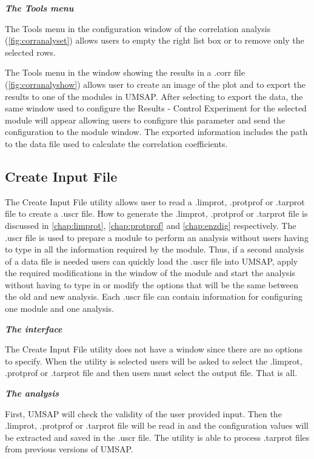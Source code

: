 \textit{\textbf{The Tools menu}}

The Tools menu in the configuration window of the correlation analysis (\autoref{fig:corranalyset}) allows users to empty the right list box or to remove only the selected rows.

The Tools menu in the window showing the results in a .corr file (\autoref{fig:corranalyshow}) allows user to create an image of the plot and to export the results to one of the modules in UMSAP. After selecting to export the data, the same window used to configure the Results - Control Experiment for the selected module will appear allowing users to configure this parameter and send the configuration to the module window. The exported information includes the path to the data file used to calculate the correlation coefficients.

\subsection{Create Input File}
\label{subsec:uscrfile}

The Create Input File utility allows user to read a .limprot, .protprof or .tarprot file to create a .uscr file. How to generate the .limprot, .protprof or .tarprot file is discussed in \autoref{chap:limprot}, \autoref{chap:protprof} and \autoref{chap:enzdig} respectively. The .uscr file is used to prepare a module to perform an analysis without users having to type in all the information required by the module. Thus, if a second analysis of a data file is needed users can quickly load the .uscr file into UMSAP, apply the required modifications in the window of the module and start the analysis without having to type in or modify the options that will be the same between the old and new analysis. Each .uscr file can contain information for configuring one module and one analysis.

\textit{\textbf{The interface}}

The Create Input File utility does not have a window since there are no options to specify. When the utility is selected users will be asked to select the .limprot, .protprof or .tarprot file and then users must select the output file. That is all.

\textit{\textbf{The analysis}}

First, UMSAP will check the validity of the user provided input. Then the .limprot, .protprof or .tarprot file will be read in and the configuration values will be extracted and saved in the .uscr file. The utility is able to process .tarprot files from previous versions of UMSAP.

